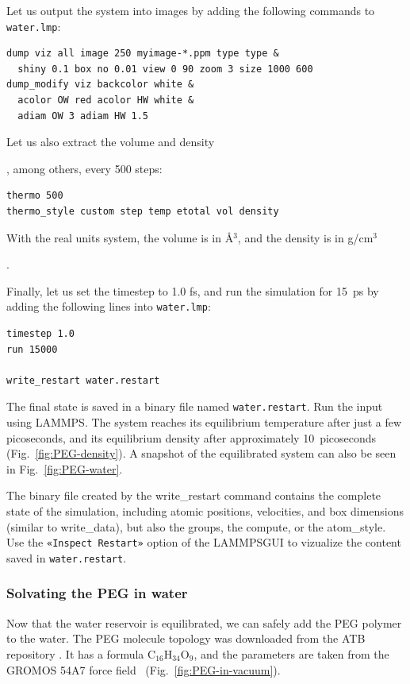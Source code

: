 \documentclass[9pt,tutorial]{livecoms}
\newcommand{\lmpcmdnote}[1]{\colorbox{note_listing}{\textcolor{command}{\small{#1}}}} %
\newcommand{\flecmd}[1]{\textcolor{command}{\texttt{#1}}} %
\newcommand{\guicmd}[1]{\textcolor{command}{\texttt{«#1»}}} %
\newcommand{\lammpsgui}{\textsf{LAMMPS\textendash GUI}}
\begin{document}
Let us output the system into images by adding the following commands to \flecmd{water.lmp}:
\begin{lstlisting}
dump viz all image 250 myimage-*.ppm type type &
  shiny 0.1 box no 0.01 view 0 90 zoom 3 size 1000 600
dump_modify viz backcolor white &
  acolor OW red acolor HW white &
  adiam OW 3 adiam HW 1.5
\end{lstlisting}
Let us also extract the volume and density{\color{blue}, among others, every 500 steps:
\begin{lstlisting}
thermo 500
thermo_style custom step temp etotal vol density
\end{lstlisting}
With the real units system, the volume is in Å$^3$, and
the density is in g/cm$^3$}.

Finally, let us set the timestep to 1.0 fs, and run the simulation for 15~ps by
adding the following lines into \flecmd{water.lmp}:
\begin{lstlisting}
timestep 1.0
run 15000

write_restart water.restart
\end{lstlisting}
The final state is saved in a binary file named \flecmd{water.restart}.
Run the input using LAMMPS.  The system reaches its equilibrium temperature
after just a few picoseconds, and its equilibrium density after approximately
10~picoseconds (Fig.~\ref{fig:PEG-density}).  A snapshot of the equilibrated
system can also be seen in Fig.~\ref{fig:PEG-water}.

\begin{note}
The binary file created by the \lmpcmdnote{write\_restart} command contains the
complete state of the simulation, including atomic positions, velocities, and
box dimensions (similar to \lmpcmdnote{write\_data}), but also the groups,
the compute, or the \lmpcmdnote{atom\_style}.  Use the \guicmd{Inspect Restart}
option of the \lammpsgui{} to vizualize the content saved in \flecmd{water.restart}.
\end{note}

\subsubsection{Solvating the PEG in water}

Now that the water reservoir is equilibrated, we can safely add the PEG polymer
to the water.  The PEG molecule topology was downloaded from the ATB repository
\cite{malde2011automated, oostenbrink2004biomolecular}.  It has a formula
$\text{C}_{16}\text{H}_{34}\text{O}_{9}$, and the parameters are taken from
the {GROMOS} 54A7 force field~\cite{schmid2011definition} (Fig.~\ref{fig:PEG-in-vacuum}).
\end{document}
